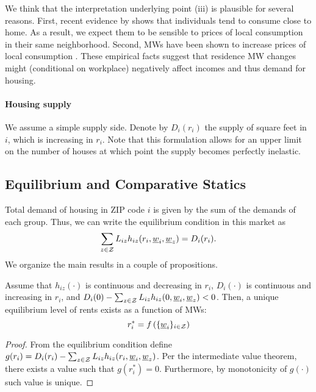 We think that the interpretation underlying point (iii) is plausible for several 
reasons.
First, recent evidence by \textcite{MiyauchiEtAl2021} shows that individuals tend 
to consume close to home.
As a result, we expect them to be sensible to prices of local consumption in their 
same neighborhood.
Second, MWs have been shown to increase prices of local consumption 
\parencite[e.g.,][]{AllegrettoReich2018, LeungForthcoming}.
These empirical facts suggest that residence MW changes might (conditional on workplace)
negatively affect incomes and thus demand for housing.

\paragraph{Housing supply}

We assume a simple supply side. Denote by $D_i(r_i)$ the supply of square feet in 
$i$, which is increasing in $r_i$.
Note that this formulation allows for an upper limit on the number of houses at 
which point the supply becomes perfectly inelastic.

\subsection{Equilibrium and Comparative Statics}

Total demand of housing in ZIP code $i$ is given by the sum of the demands of each group. 
Thus, we can write the equilibrium condition in this market as
\begin{equation}\label{eq:equilibrium}
	\sum_{z\in\mathcal{Z}} L_{iz} h_{iz} (r_i, \underline{w}_i, \underline{w}_z) = D_i(r_i) .
\end{equation}
We organize the main results in a couple of propositions.

\begin{prop}[Equilibrium]\label{prop:equilibrium}
    Assume that $h_{iz}(\cdot)$ is continuous and decreasing in $r_i$, $D_i(\cdot)$ 
    is     continuous and increasing in $r_i$, and $D_i(0) - \sum_{z\in\mathcal{Z}} L_{iz} 
    h_{iz} (0, \underline{w}_i, \underline{w}_z) < 0$. Then, a unique equilibrium level of rents exists 
    as a function of MWs:
    $$r_i^* =  f\left(\{\underline{w}_i\}_{i\in\mathcal{Z}}\right)$$
\end{prop}
\begin{proof}
    From the equilibrium condition define $g(r_i) = D_i(r_i) - \sum_{z\in\mathcal{Z}} L_{iz} 
    h_{iz} (r_i, \underline{w}_i, \underline{w}_z)$. Per the intermediate value theorem, there exists 
    a value such that $g(r_i^*) = 0$. Furthermore, by monotonicity of $g(\cdot)$ 
    such value is unique.
\end{proof}

